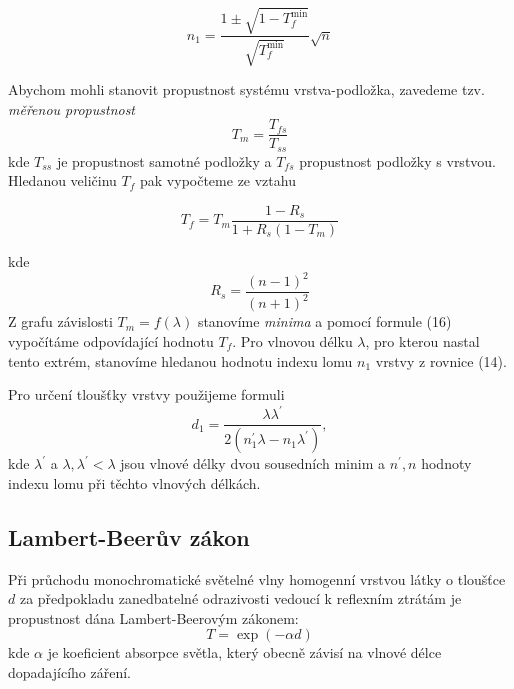 \documentclass[czech,11pt,a4paper]{article}
\begin{document}
\begin{multicols}{2}
\begin{equation}
	n_{1}=\frac{1 \pm \sqrt{1-T_{f}^{\min }}}{\sqrt{T_{f}^{\min }}} \sqrt{n}
\end{equation}

	Abychom mohli stanovit propustnost systému vrstva-podložka, zavedeme tzv. \textit{měřenou propustnost}
	\begin{equation}
		T_m = \frac {T_{fs}}{T_{ss}}
	\end{equation}
	kde $T_{ss}$ je propustnost samotné podložky a $T_{fs}$ propustnost podložky s vrstvou. Hledanou veličinu $T_f$ pak vypočteme ze vztahu
	
\begin{equation}
		T_{f}=T_{m} \frac{1-R_{s}}{1+R_{s}\left(1-T_{m}\right)}
\end{equation}
	
	kde
	\begin{equation}
		R_{s}=\frac {(n-1)^{2}}{(n+1)^{2}}
	\end{equation}
	Z grafu závislosti $T_m = f(\lambda)$ stanovíme \textit{minima} a pomocí formule (16) vypočítáme odpovídající hodnotu $T_f$. Pro vlnovou délku $\lambda$, pro kterou nastal tento extrém, stanovíme hledanou hodnotu indexu lomu $n_1$ vrstvy z rovnice (14).
	
	Pro určení tloušťky vrstvy použijeme formuli
	\begin{equation}
		d_1 = \frac{\lambda\lambda^\prime}{2(n_1^\prime \lambda-n_1\lambda^\prime)},
	\end{equation}
	kde $\lambda^\prime$ a $\lambda, \lambda^\prime < \lambda$ jsou vlnové délky dvou sousedních minim a $n^\prime, n$ hodnoty indexu lomu při těchto vlnových délkách. 
	
	\subsection{Lambert-Beerův zákon}
	Při průchodu monochromatické světelné vlny homogenní vrstvou látky o tloušťce $d$ za předpokladu zanedbatelné odrazivosti vedoucí k reflexním ztrátám je propustnost dána Lambert-Beerovým zákonem:	
	\begin{equation}
		T=\exp (-\alpha d)
	\end{equation}
	kde $\alpha$ je koeficient absorpce světla, který obecně závisí na vlnové délce dopadajícího záření. 

\end{multicols}
\end{document}

